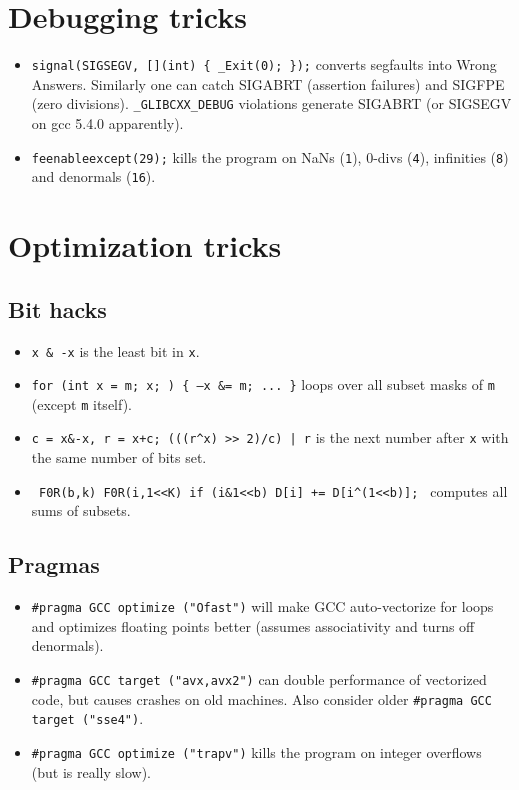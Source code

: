 \section{Debugging tricks}
	\begin{itemize}
		\item \texttt{signal(SIGSEGV, [](int) \{ \_Exit(0); \});} converts segfaults into Wrong Answers.
			Similarly one can catch SIGABRT (assertion failures) and SIGFPE (zero divisions).
			\texttt{\_GLIBCXX\_DEBUG} violations generate SIGABRT (or SIGSEGV on gcc 5.4.0 apparently).
		\item \texttt{feenableexcept(29);} kills the program on NaNs (\texttt 1), 0-divs (\texttt 4), infinities (\texttt 8) and denormals (\texttt{16}).
	\end{itemize}

\section{Optimization tricks}
	\subsection{Bit hacks}
		\begin{itemize}
			\item \texttt{x \& -x} is the least bit in \texttt{x}.
			\item \texttt{for (int x = m; x; ) \{ --x \&= m; ... \}} loops over all subset masks of \texttt{m} (except \texttt{m} itself).
			\item \texttt{c = x\&-x, r = x+c; (((r\^{}x) >> 2)/c) | r} is the next number after \texttt{x} with the same number of bits set.
			\item \texttt{ F0R(b,k) F0R(i,1<<K) if (i\&1<<b) D[i] += D[i\^{}(1<<b)]; } computes all sums of subsets.
		\end{itemize}
	\subsection{Pragmas}
	
		\begin{itemize}
			\item \lstinline{#pragma GCC optimize ("Ofast")} will make GCC auto-vectorize for loops and optimizes floating points better (assumes associativity and turns off denormals).
			\item \lstinline{#pragma GCC target ("avx,avx2")} can double performance of vectorized code, but causes crashes on old machines. Also consider older \lstinline{#pragma GCC target ("sse4")}.
			\item \lstinline{#pragma GCC optimize ("trapv")} kills the program on integer overflows (but is really slow).
		\end{itemize}
	

